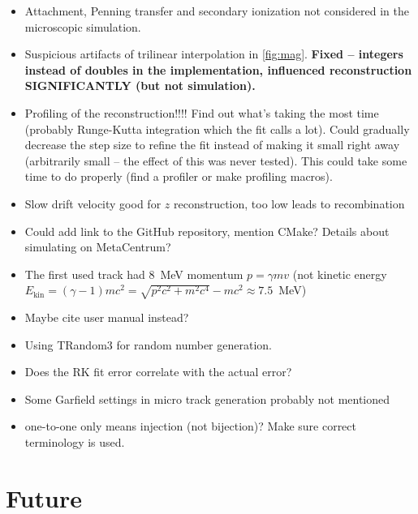 {\begin{itemize}[topsep=4pt,itemsep=2pt]
				\item Attachment, Penning transfer and secondary ionization not considered in the microscopic simulation.
				\item Suspicious artifacts of trilinear interpolation in \cref{fig:mag}. \textbf{Fixed -- integers instead of doubles in the implementation, influenced reconstruction SIGNIFICANTLY (but not simulation).}
				\item Profiling of the reconstruction!!!! Find out what's taking the most time (probably Runge-Kutta integration which the fit calls a lot). Could gradually decrease the step size to refine the fit instead of making it small right away (arbitrarily small -- the effect of this was never tested). This could take some time to do properly (find a profiler or make profiling macros).
				\item Slow drift velocity good for $z$ reconstruction, too low leads to recombination
				\item Could add link to the GitHub repository, mention CMake? Details about simulating on MetaCentrum?
				\item The first used track had 8~MeV momentum $p = \gamma m v$ (not kinetic energy $E_\text{kin} = (\gamma-1) m c^2 = \sqrt{p^2c^2+m^2c^4}-mc^2 \approx 7.5$~MeV)
				\item Maybe cite \garfieldpp user manual instead?
				\item Using TRandom3 for random number generation.
				\item Does the RK fit error correlate with the actual error?
				\item Some Garfield settings in micro track generation probably not mentioned
				\item one-to-one only means injection (not bijection)? Make sure correct terminology is used.
			\end{itemize}
		}
	\section*{Future}
	
